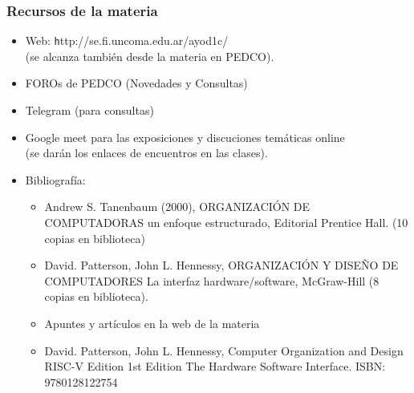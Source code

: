 \documentclass[aspectratio=169,compress]{beamer}
\begin{document}
\begin{frame}[fragile]
  \frametitle{Recursos de la materia}

\begin{small}
\begin{itemize}

\item Web: \footnotesize{\texttt http://se.fi.uncoma.edu.ar/ayod1c/}\\
(se alcanza también desde la materia en PEDCO).

\item FOROs de PEDCO (Novedades y Consultas)
\item Telegram (para consultas)
\item Google meet para las exposiciones y discuciones temáticas online\\ (se darán los enlaces de encuentros en las clases).
\item Bibliografía:

\begin{itemize}

\item Andrew S. Tanenbaum (2000), ORGANIZACIÓN DE COMPUTADORAS un enfoque estructurado, Editorial Prentice Hall. (10 copias en biblioteca)
\item David. Patterson, John L. Hennessy, ORGANIZACIÓN Y DISEÑO DE COMPUTADORES La interfaz hardware/software, McGraw-Hill (8 copias en biblioteca).
\item Apuntes y artículos en la web de la materia
\item David. Patterson, John L. Hennessy, Computer Organization and Design RISC-V Edition 1st Edition The Hardware Software Interface. ISBN: 9780128122754

\end{itemize}

\end{itemize}
\end{small}

\end{frame}
\end{document}

